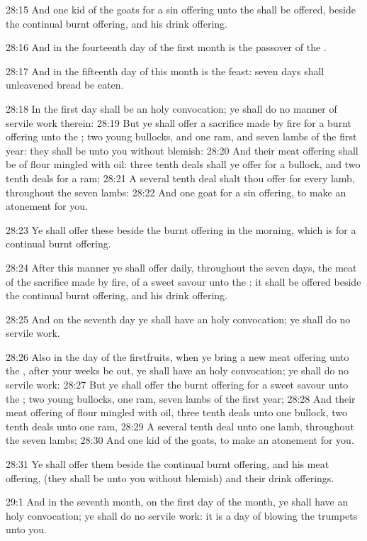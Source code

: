 28:15 And one kid of the goats for a sin offering unto the \LORD shall
be offered, beside the continual burnt offering, and his drink
offering.

28:16 And in the fourteenth day of the first month is the passover of
the \LORD.

28:17 And in the fifteenth day of this month is the feast: seven days
shall unleavened bread be eaten.

28:18 In the first day shall be an holy convocation; ye shall do no
manner of servile work therein: 28:19 But ye shall offer a sacrifice
made by fire for a burnt offering unto the \LORD; two young bullocks,
and one ram, and seven lambs of the first year: they shall be unto you
without blemish: 28:20 And their meat offering shall be of flour
mingled with oil: three tenth deals shall ye offer for a bullock, and
two tenth deals for a ram; 28:21 A several tenth deal shalt thou offer
for every lamb, throughout the seven lambs: 28:22 And one goat for a
sin offering, to make an atonement for you.

28:23 Ye shall offer these beside the burnt offering in the morning,
which is for a continual burnt offering.

28:24 After this manner ye shall offer daily, throughout the seven
days, the meat of the sacrifice made by fire, of a sweet savour unto
the \LORD: it shall be offered beside the continual burnt offering, and
his drink offering.

28:25 And on the seventh day ye shall have an holy convocation; ye
shall do no servile work.

28:26 Also in the day of the firstfruits, when ye bring a new meat
offering unto the \LORD, after your weeks be out, ye shall have an holy
convocation; ye shall do no servile work: 28:27 But ye shall offer the
burnt offering for a sweet savour unto the \LORD; two young bullocks,
one ram, seven lambs of the first year; 28:28 And their meat offering
of flour mingled with oil, three tenth deals unto one bullock, two
tenth deals unto one ram, 28:29 A several tenth deal unto one lamb,
throughout the seven lambs; 28:30 And one kid of the goats, to make an
atonement for you.

28:31 Ye shall offer them beside the continual burnt offering, and his
meat offering, (they shall be unto you without blemish) and their
drink offerings.

29:1 And in the seventh month, on the first day of the month, ye shall
have an holy convocation; ye shall do no servile work: it is a day of
blowing the trumpets unto you.

